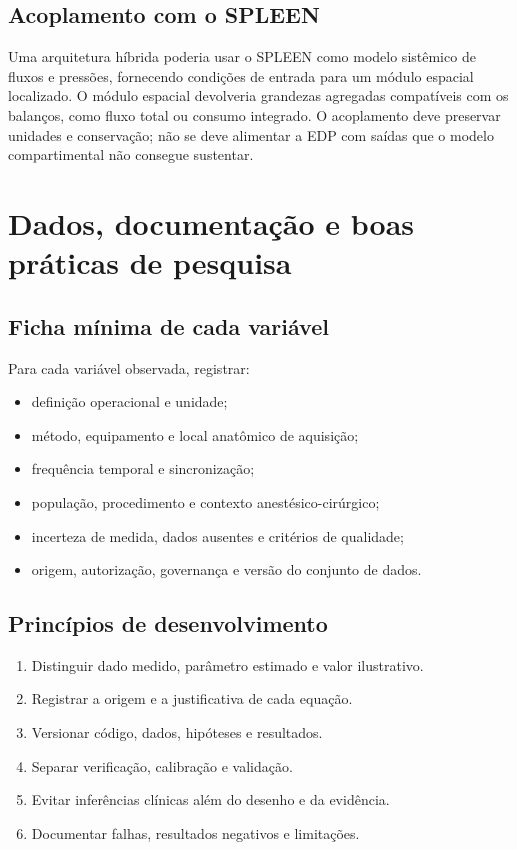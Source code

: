 \documentclass[11pt,a4paper,oneside]{book}
\begin{document}
\section{Acoplamento com o SPLEEN}
Uma arquitetura híbrida poderia usar o SPLEEN como modelo sistêmico de fluxos e pressões, fornecendo condições de entrada para um módulo espacial localizado. O módulo espacial devolveria grandezas agregadas compatíveis com os balanços, como fluxo total ou consumo integrado. O acoplamento deve preservar unidades e conservação; não se deve alimentar a EDP com saídas que o modelo compartimental não consegue sustentar.

\chapter{Dados, documentação e boas práticas de pesquisa}

\section{Ficha mínima de cada variável}
Para cada variável observada, registrar:
\begin{itemize}
  \item definição operacional e unidade;
  \item método, equipamento e local anatômico de aquisição;
  \item frequência temporal e sincronização;
  \item população, procedimento e contexto anestésico-cirúrgico;
  \item incerteza de medida, dados ausentes e critérios de qualidade;
  \item origem, autorização, governança e versão do conjunto de dados.
\end{itemize}

\section{Princípios de desenvolvimento}
\begin{enumerate}
  \item Distinguir dado medido, parâmetro estimado e valor ilustrativo.
  \item Registrar a origem e a justificativa de cada equação.
  \item Versionar código, dados, hipóteses e resultados.
  \item Separar verificação, calibração e validação.
  \item Evitar inferências clínicas além do desenho e da evidência.
  \item Documentar falhas, resultados negativos e limitações.
\end{enumerate}
\end{document}
